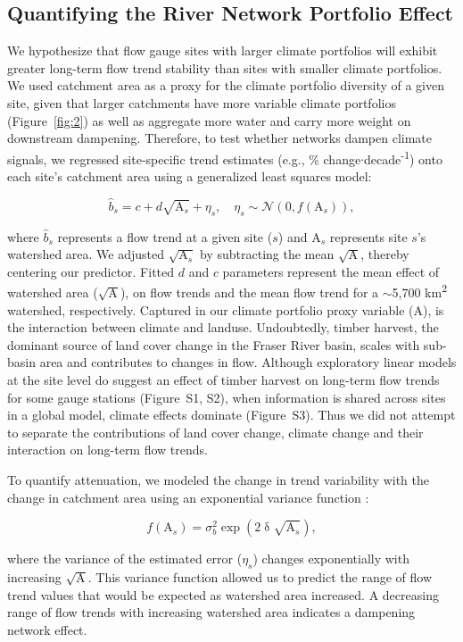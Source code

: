 \documentclass[draft,linenumbers]{AGUJournal}
\begin{document}
\subsection{Quantifying the River Network Portfolio Effect}

We hypothesize that flow gauge sites with larger climate portfolios will exhibit greater long-term flow trend stability than sites with smaller climate portfolios. We used catchment area as a proxy for the climate portfolio diversity of a given site, given that larger catchments have more variable climate portfolios (Figure~\ref{fig:2}) as well as aggregate more water and carry more weight on downstream dampening. Therefore, to test whether networks dampen climate signals, we regressed site-specific trend estimates (e.g., \% change$\cdot$decade\textsuperscript{-1}) onto each site's catchment area using a generalized least squares model:
\begin{linenomath*}
\begin{equation}
	\hat{b}_{s} = c + d\sqrt{\mathrm{A}_{s}} + \eta_{s}, \quad
  \eta_{s} \sim \mathcal{N}(0, f(\mathrm{A}_{s})) \label{eq3},
\end{equation}
\end{linenomath*}
where $\hat{b}_{s}$ represents a flow trend at a given site ($s$) and $\mathrm{A}_{s}$ represents site $s$'s watershed area. We adjusted $\sqrt{\mathrm{A}_{s}}$ by subtracting the mean $\sqrt{\mathrm{A}}$, thereby centering our predictor. Fitted $d$ and $c$ parameters represent the mean effect of watershed area ($\sqrt{\mathrm{A}}$), on flow trends and the mean flow trend for a $\sim$5,700 km\textsuperscript{2} watershed, respectively. Captured in our climate portfolio proxy variable ($\mathrm{A}$), is the interaction between climate and landuse. Undoubtedly, timber harvest, the dominant source of land cover change in the Fraser River basin, scales with sub-basin area and contributes to changes in flow. Although exploratory linear models at the site level do suggest an effect of timber harvest on long-term flow trends for some gauge stations (Figure~S1, S2), when information is shared across sites in a global model, climate effects dominate (Figure~S3). Thus we did not attempt to separate the contributions of land cover change, climate change and their interaction on long-term flow trends.

To quantify attenuation, we modeled the change in trend variability with the change in catchment area using an exponential variance function \citep[p.~211]{Pinheiro:2000}: 
\begin{linenomath*}
\begin{equation}
	f(\mathrm{A}_{s}) = \sigma_b^2 \exp(2\updelta\sqrt{\mathrm{A}_{s}}) \label{eq4},
\end{equation}
\end{linenomath*}
where the variance of the estimated error ($\eta_{s}$) changes exponentially with increasing $\sqrt{\mathrm{A}}$. This variance function allowed us to predict the range of flow trend values that would be expected as watershed area increased. A decreasing range of flow trends with increasing watershed area indicates a dampening network effect.
\end{document}
